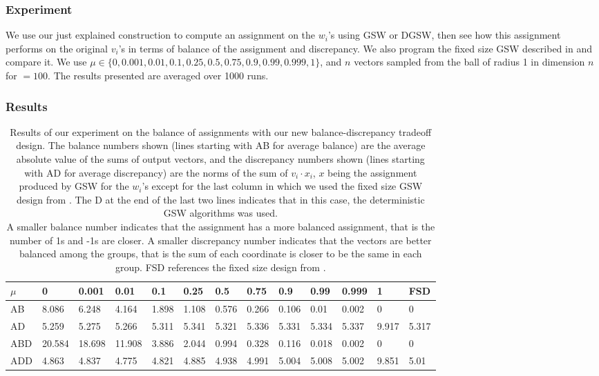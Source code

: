 \documentclass[12pt]{article}
\begin{document}
\subsubsection{Experiment}
We use our just explained construction to compute an assignment on the $w_i$'s using GSW or DGSW, then see how this assignment performs on the original $v_i$'s in terms of balance of the assignment and discrepancy. We also program the fixed size GSW described in \cite{harshaw2019balancing} and compare it. We use $\mu\in\{0,0.001,0.01,0.1,0.25,0.5,0.75,0.9,0.99,0.999,1\}$, and $n$ vectors sampled from the ball of radius 1 in dimension $n$ for $=100$. The results presented are averaged over 1000 runs.

\subsubsection{Results}

\begin{center}
\begin{table}[h]
\begin{tabular}{l|llllllllllll}
 $\mu$ &0&0.001&0.01&0.1&0.25&0.5&0.75&0.9&0.99&0.999&1&FSD \cite{harshaw2019balancing}\\
\hline
AB&8.086&6.248&4.164&1.898&1.108&0.576&0.266&0.106&0.01&0.002&0&0 \\
AD&5.259&5.275&5.266&5.311&5.341&5.321&5.336&5.331&5.334&5.337&9.917&5.317\\
ABD&20.584&18.698&11.908&3.886&2.044&0.994&0.328&0.116&0.018&0.002&0&0\\
ADD&4.863&4.837&4.775&4.821&4.885&4.938&4.991&5.004&5.008&5.002&9.851&5.01
\end{tabular}
\caption{Results of our experiment on the balance of assignments with our new balance-discrepancy tradeoff design. The balance numbers shown (lines starting with AB for average balance) are the average absolute value of the sums of output vectors, and the discrepancy numbers shown (lines starting with AD for average discrepancy) are the norms of the sum of $v_i\cdot x_i$, $x$ being the assignment produced by GSW for the $w_i$'s except for the last column in which we used the fixed size GSW design from \cite{harshaw2019balancing}. The D at the end of the last two lines indicates that in this case, the deterministic GSW algorithms was used. \\A smaller balance number indicates that the assignment has a more balanced assignment, that is the number of 1s and -1s are closer. A smaller discrepancy number indicates that the vectors are better balanced among the groups, that is the sum of each coordinate is closer to be the same in each group. FSD \cite{harshaw2019balancing} references the fixed size design from \cite{harshaw2019balancing}.}
\label{balance_tradeoff_results}
\end{table}
\end{center}
\end{document}
